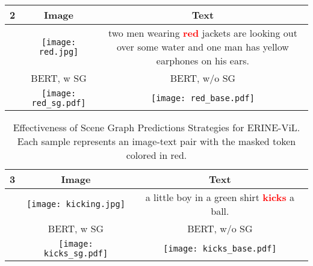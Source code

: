 \documentclass[letterpaper]{article} \usepackage{aaai21}  \usepackage{times}  \usepackage{helvet} \usepackage{courier}  \usepackage[hyphens]{url}  \usepackage{graphicx} \urlstyle{rm} \def\UrlFont{\rm}  \usepackage{natbib}  \usepackage{caption} \frenchspacing  \setlength{\pdfpagewidth}{8.5in}  \setlength{\pdfpageheight}{11in}  \usepackage{cite}
\begin{document}
\begin{table}
\centering
\begin{tabular}{c|cc} 
\hline
2 &Image  & Text    \\ 
\hline

&\begin{minipage}{0.20\textwidth}
\texttt{[image: red.jpg]}
\end{minipage} 
&
 \begin{minipage}{0.20\textwidth}
\small{two men wearing \textcolor{red}{\textbf{red}} jackets are looking out over some water and one man has yellow earphones on his ears.}  

\end{minipage}  \\ \hline
 & \small{BERT, w SG}  & \small{BERT, w/o SG}    \\ \hline
&\begin{minipage}{0.20\textwidth}
\texttt{[image: red\_sg.pdf]}
\end{minipage} 
& 
\begin{minipage}{0.20\textwidth}
\texttt{[image: red\_base.pdf]} 
\end{minipage} \\ \hline
\end{tabular}
\end{table}

\begin{table}
\begin{tabular}{c|cc} 
\hline
3 &Image  & Text    \\ 
\hline

&\begin{minipage}{0.20\textwidth}
\texttt{[image: kicking.jpg]}
\end{minipage} 
&
 \begin{minipage}{0.20\textwidth}
\small{a little boy in a green shirt \textcolor{red}{\textbf{kicks}} a ball.}  

\end{minipage}  \\ \hline
 & \small{BERT, w SG}  & \small{BERT, w/o SG}    \\ \hline
&\begin{minipage}{0.20\textwidth}
\texttt{[image: kicks\_sg.pdf]}
\end{minipage} 
& 
\begin{minipage}{0.20\textwidth}
\texttt{[image: kicks\_base.pdf]} 
\end{minipage} \\ \hline
\end{tabular}
\caption{Effectiveness of Scene Graph Predictions Strategies for ERINE-ViL.  Each sample represents an image-text pair with the masked token colored in red.}
\label{tab_cloze}
\end{table}
\fi
\end{document}
